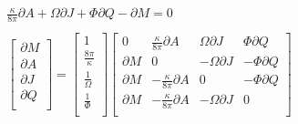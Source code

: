 \begin{equation*}
\displaystyle \begin{array}{lll}\\
 \displaystyle \frac{\kappa}{8 \pi} \partial A + \Omega \partial J + \Phi \partial Q - \partial M = 0 \\\\
\begin{bmatrix} 
\partial M \\
\partial A \\
\partial J \\
\partial Q \\
\end{bmatrix}
=
\begin{bmatrix} 
1\\
\frac{8 \pi}{\kappa}\\
\frac{1}{\Omega}\\
\frac{1}{\Phi}\\
\end{bmatrix}
\begin{bmatrix} 
0 & \frac{\kappa}{8 \pi} \partial A & \Omega \partial J & \Phi \partial Q\\
\partial M & 0 & - \Omega \partial J & - \Phi \partial Q\\
\partial M & - \frac{\kappa}{8 \pi} \partial A & 0 & - \Phi \partial Q\\
\partial M & - \frac{\kappa}{8 \pi} \partial A & - \Omega \partial J & 0\\
\end{bmatrix}
\end{array}
\end{equation*}